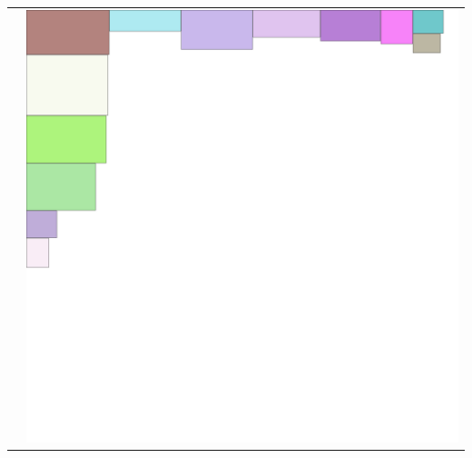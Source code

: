 \documentclass[10pt, unicode]{beamer}
\begin{document}
\begin{frame}
\begin{table}[ht]
\begin{center}
\begin{tabular}{cc}
                &\includegraphics[scale=0.08]{rect_1.png}
            \end{tabular}
            \end{center}
        \end{table}
    \end{frame}
\end{document}

